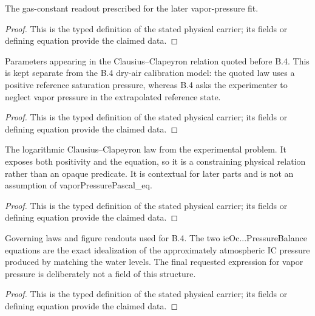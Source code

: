 \begin{definition}
  \label{def:physics:IPhO_2026_4_B_4:aux011}
  The gas-constant readout prescribed for the later vapor-pressure fit.
\end{definition}
\begin{proof}
  This is the typed definition of the stated physical carrier; its fields or defining equation provide the claimed data.
\end{proof}

\begin{definition}
  \label{def:physics:IPhO_2026_4_B_4:aux012}
  Parameters appearing in the Clausius--Clapeyron relation quoted before B.4. This is kept separate from the B.4 dry-air calibration model: the quoted law uses a positive reference saturation pressure, whereas B.4 asks the experimenter to neglect vapor pressure in the extrapolated reference state.
\end{definition}
\begin{proof}
  This is the typed definition of the stated physical carrier; its fields or defining equation provide the claimed data.
\end{proof}

\begin{definition}
  \label{def:physics:IPhO_2026_4_B_4:aux013}
  The logarithmic Clausius--Clapeyron law from the experimental problem. It exposes both positivity and the equation, so it is a constraining physical relation rather than an opaque predicate. It is contextual for later parts and is not an assumption of vaporPressurePascal\_eq.
\end{definition}
\begin{proof}
  This is the typed definition of the stated physical carrier; its fields or defining equation provide the claimed data.
\end{proof}

\begin{definition}
  \label{def:physics:IPhO_2026_4_B_4:aux014}
  Governing laws and figure readouts used for B.4. The two icOc...PressureBalance equations are the exact idealization of the approximately atmospheric IC pressure produced by matching the water levels. The final requested expression for vapor pressure is deliberately not a field of this structure.
\end{definition}
\begin{proof}
  This is the typed definition of the stated physical carrier; its fields or defining equation provide the claimed data.
\end{proof}

